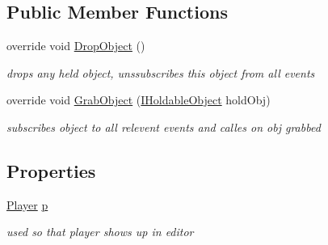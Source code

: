 \subsection*{Public Member Functions}
\begin{DoxyCompactItemize}
\item 
override void \mbox{\hyperlink{class_p_c_player_hand_a42c7ffd95f8493901c93e2c1e4576585}{Drop\+Object}} ()
\begin{DoxyCompactList}\small\item\em drops any held object, unssubscribes this object from all events \end{DoxyCompactList}\item 
override void \mbox{\hyperlink{class_p_c_player_hand_a08da28b459501727d269733569559c24}{Grab\+Object}} (\mbox{\hyperlink{interface_i_holdable_object}{I\+Holdable\+Object}} hold\+Obj)
\begin{DoxyCompactList}\small\item\em subscribes object to all relevent events and calles on obj grabbed \end{DoxyCompactList}\end{DoxyCompactItemize}
\subsection*{Properties}
\begin{DoxyCompactItemize}
\item 
\mbox{\hyperlink{class_player}{Player}} \mbox{\hyperlink{class_p_c_player_hand_a8c3efd819803169fc351ce8e456a8a0f}{p}}
\begin{DoxyCompactList}\small\item\em used so that player shows up in editor \end{DoxyCompactList}\end{DoxyCompactItemize}
